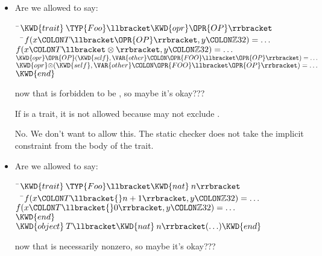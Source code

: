 \begin{itemize}
\item Are we allowed to say:
\begin{Fortress}
{\tt~}\pushtabs\=\+\( \KWD{trait}\:\TYP{Foo}\llbracket\KWD{opr} \mathord{\OPR{OP}}\rrbracket\)\\
{\tt~~}\pushtabs\=\+\(   f(x\COLON T\llbracket\OPR{OP}\rrbracket, y\COLON \mathbb{Z}32) = \ldots\)\\
\(   f(x\COLON T\llbracket\otimes\rrbracket, y\COLON \mathbb{Z}32) = \ldots\)\\
\(   \KWD{opr} \mathord{\OPR{OP}}(\KWD{self}, \VAR{other}\COLON \OPR{FOO}\llbracket\OPR{OP}\rrbracket) = \ldots\)\\
\(   \KWD{opr} \mathord{\otimes}(\KWD{self}, \VAR{other}\COLON \OPR{FOO}\llbracket\OPR{OP}\rrbracket) = \ldots\)\-\\\poptabs
\( \KWD{end}\)\-\\\poptabs
\end{Fortress}
now that  is forbidden to be \EXP{\otimes},
so maybe it's okay???

If  is a trait, it is not allowed because 
may not exclude .

No. We don't want to allow this. The static checker does not take the implicit constraint from the body of the trait.

\item Are we allowed to say:
\begin{Fortress}
{\tt~}\pushtabs\=\+\( \KWD{trait}\:\TYP{Foo}\llbracket\KWD{nat}\:n\rrbracket\)\\
{\tt~~}\pushtabs\=\+\(   f(x\COLON T\llbracket{}n+1\rrbracket, y\COLON \mathbb{Z}32) = \ldots\)\\
\(   f(x\COLON T\llbracket{}0\rrbracket, y\COLON \mathbb{Z}32) = \ldots\)\-\\\poptabs
\( \KWD{end}\)\\
\( \KWD{object}\:T\llbracket\KWD{nat}\:n\rrbracket( \ldots ) \KWD{end}\)\-\\\poptabs
\end{Fortress}
now that  is necessarily nonzero, so maybe it's okay???


\end{itemize}
